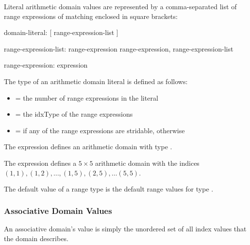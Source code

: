 Literal arithmetic domain values are represented by a comma-separated
list of range expressions of matching  enclosed in
square brackets:

%
%

\begin{syntax}
domain-literal:
  [ range-expression-list ]

range-expression-list:
  range-expression
  range-expression, range-expression-list

range-expression:
  expression
\end{syntax}

\noindent The type of an arithmetic domain literal is defined as follows:

\begin{itemize}

\item {} = the number of range expressions in the literal

\item {} = the idxType of the range expressions

\item {} =  if any of the range expressions
are stridable, otherwise 

\end{itemize}

\begin{example}
The expression \chpl{[1..5, 1..5]} defines an arithmetic domain with
type   .
\end{example}

\begin{example}
The expression \chpl{[1..5, 1..5]} defines a $5 \times 5$ arithmetic
domain with the indices $(1, 1), (1, 2), \ldots, (1, 5), (2, 5), \ldots (5, 5)$.
\end{example}

The default value of a range type is the  default range
values for type  
.


\subsubsection{Associative Domain Values}

An associative domain's value is simply the unordered set of all index
values that the domain describes.

